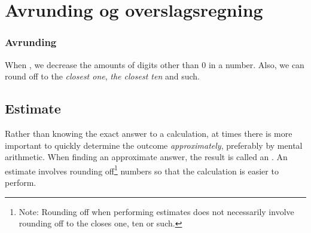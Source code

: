 \section{Avrunding og overslagsregning}

\subsubsection{Avrunding}
When , we decrease the amounts of digits other than 0 in a number. Also, we can round off to the \textsl{closest one}, \textsl{the closest ten} and such.\regv
{}


\subsection{Estimate}
Rather than knowing the exact answer to a calculation, at times there is more important to quickly determine the outcome \textsl{approximately}, preferably by mental arithmetic. When finding an approximate answer, the result is called an . An estimate involves rounding off\footnote{Note: Rounding off when performing estimates does not necessarily involve rounding off to the closes one, ten or such.} numbers so that the calculation is easier to perform. \regv

